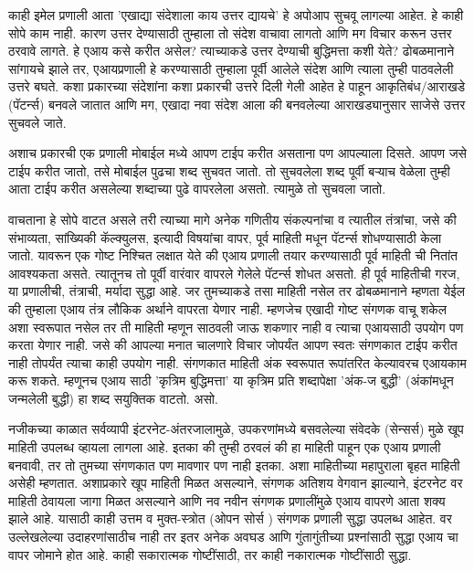 काही इमेल प्रणाली आता 'एखाद्या संदेशाला काय उत्तर द्यायचे' हे अपोआप सुचवू लागल्या आहेत. हे काही सोपे काम नाही. कारण उत्तर देण्यासाठी तुम्हाला तो संदेश वाचावा लागतो आणि मग विचार करून उत्तर ठरवावे लागते. हे एआय कसे करीत असेल? त्याच्याकडे उत्तर देण्याची बुद्धिमत्ता कशी येते? ढोबळमानाने सांगायचे झाले तर, एआयप्रणाली हे करण्यासाठी तुम्हाला पूर्वी आलेले संदेश आणि त्याला तुम्ही पाठवलेली उत्तरे बघते. कशा प्रकारच्या संदेशांना कशा प्रकारची उत्तरे दिली गेली आहेत हे पाहून आकृतिबंध/आराखडे (पॅटर्न्स) बनवले जातात आणि मग, एखादा नवा संदेश आला की बनवलेल्या आराखड्यानुसार साजेसे उत्तर सुचवले जाते.

अशाच प्रकारची एक प्रणाली मोबाईल  मध्ये आपण टाईप करीत असताना पण आपल्याला दिसते. आपण जसे टाईप करीत जातो, तसे मोबाईल  पुढचा शब्द सुचवत जातो. तो सुचवलेला शब्द पूर्वी बऱ्याच वेळेला तुम्ही आता टाईप करीत असलेल्या शब्दाच्या पुढे वापरलेला असतो. त्यामुळे तो सुचवला जातो.

वाचताना हे सोपे वाटत असले तरी त्याच्या मागे अनेक गणितीय संकल्पनांचा व त्यातील तंत्रांचा, जसे की  संभाव्यता, सांख्यिकी कॅल्क्युलस, इत्यादी विषयांचा वापर,  पूर्व माहिती मधून पॅटर्न्स  शोधण्यासाठी केला जातो. यावरून एक गोष्ट निश्चित लक्षात येते की एआय प्रणाली तयार करण्यासाठी पूर्व माहिती ची नितांत आवश्यकता असते. त्यातूनच तो पूर्वी वारंवार वापरले गेलेले पॅटर्न्स  शोधत असतो. ही पूर्व माहितीची गरज, या प्रणालीची, तंत्राची, मर्यादा सुद्धा आहे. जर तुमच्याकडे तसा माहिती नसेल तर ढोबळमानाने म्हणता येईल की तुम्हाला एआय तंत्र लौकिक अर्थाने वापरता येणार नाही. म्हणजेच एखादी गोष्ट संगणक वाचू शकेल अशा स्वरूपात नसेल तर ती माहिती म्हणून साठवली जाऊ शकणार नाही व त्याचा एआयसाठी उपयोग पण करता येणार नाही. जसे की आपल्या मनात चालणारे विचार जोपर्यंत आपण स्वतः संगणकात टाईप करीत नाही तोपर्यंत त्याचा काही उपयोग नाही. संगणकात माहिती अंक स्वरूपात रूपांतरित केल्यावरच एआयकाम करू शकते. म्हणूनच एआय साठी 'कृत्रिम बुद्धिमत्ता' या कृत्रिम प्रति शब्दापेक्षा 'अंक-ज बुद्धी' (अंकांमधून जन्मलेली बुद्धी) हा शब्द सयुक्तिक वाटतो. असो.

नजीकच्या काळात सर्वव्यापी इंटरनेट-अंतरजालामुळे, उपकरणांमध्ये बसवलेल्या संवेदके (सेन्सर्स)  मुळे खूप माहिती उपलब्ध व्हायला लागला आहे. इतका की तुम्ही ठरवलं की हा माहिती पाहून एक एआय प्रणाली बनवावी, तर तो तुमच्या संगणकात पण मावणार पण नाही इतका. अशा माहितीच्या महापुराला बृहत माहिती असेही म्हणतात. अशाप्रकारे खूप माहिती मिळत असल्याने, संगणक अतिशय वेगवान झाल्याने, इंटरनेट वर माहिती ठेवायला जागा मिळत असल्याने आणि नव नवीन संगणक प्रणालींमुळे एआय वापरणे आता शक्य झाले आहे. यासाठी काही उत्तम व मुक्त-स्त्रोत (ओपन सोर्स ) संगणक प्रणाली सुद्धा उपलब्ध आहेत. वर उल्लेखलेल्या उदाहरणांसाठीच नाही तर इतर अनेक अवघड आणि गुंतागुंतीच्या प्रश्नांसाठी सुद्धा एआय चा वापर जोमाने होत आहे. काही सकारात्मक गोष्टींसाठी, तर काही नकारात्मक गोष्टींसाठी सुद्धा.

